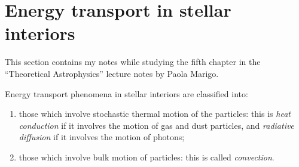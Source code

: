 \documentclass[main.tex]{subfiles}
\begin{document}
\section{Energy transport in stellar interiors}

This section contains my notes while studying the fifth chapter in the  ``Theoretical Astrophysics'' lecture notes by Paola Marigo. 

Energy transport phenomena in stellar interiors are classified into: 
\begin{enumerate}
  \item those which involve stochastic thermal motion of the particles: this is \emph{heat conduction} if it involves the motion of gas and dust particles, and \emph{radiative diffusion} if it involves the motion of photons;
  \item those which involve bulk motion of particles: this is called \emph{convection}. 
\end{enumerate}
\end{document}
